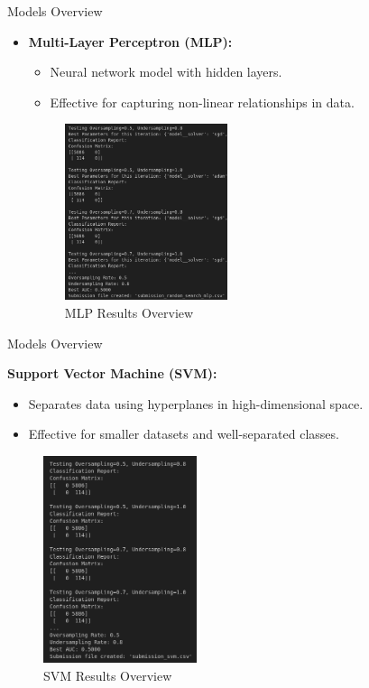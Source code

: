 \documentclass{beamer}
\begin{document}
\begin{frame}{Models Overview}
    \begin{itemize}
        \item \textbf{Multi-Layer Perceptron (MLP):}
        \begin{itemize}
            \item Neural network model with hidden layers.
            \item Effective for capturing non-linear relationships in data.
        \end{itemize}
    \begin{figure}
        \centering
        \includegraphics[width=0.45\textwidth]{images/mlp.png} %
        \caption{MLP Results Overview}
    \end{figure}
    \end{itemize}
\end{frame}

\begin{frame}{Models Overview}
        \item \textbf{Support Vector Machine (SVM):}
        \begin{itemize}
            \item Separates data using hyperplanes in high-dimensional space.
            \item Effective for smaller datasets and well-separated classes.
        \end{itemize}
    \begin{figure}
        \centering
        \includegraphics[width=0.4\textwidth]{images/svm.png} %
        \caption{SVM Results Overview}
    \end{figure}
\end{frame}
\end{document}
